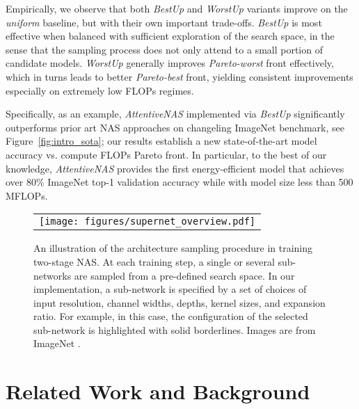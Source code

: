 \documentclass[final]{cvpr}
\theoremstyle{definition}
\begin{document}
Empirically, we observe that both \emph{BestUp} and \emph{WorstUp} variants improve on the \emph{uniform} baseline, but with their own important trade-offs. 
\emph{BestUp} is most effective when balanced with sufficient exploration of the search space, in the sense that the sampling process does not only attend to a small 
portion of candidate models. 
\emph{WorstUp} generally improves \emph{Pareto-worst} front effectively, 
which in turns leads to better \emph{Pareto-best} front, yielding 
consistent improvements especially on extremely low FLOPs regimes. 


Specifically, as an example, \emph{AttentiveNAS} implemented via \emph{BestUp} significantly outperforms prior art NAS approaches on changeling ImageNet benchmark, see Figure~\ref{fig:intro_sota};
our results establish a new state-of-the-art model accuracy vs.  compute FLOPs Pareto front.  In particular,  to the best of our knowledge, \emph{AttentiveNAS} 
provides the first energy-efficient model that achieves  over 80\% ImageNet top-1 validation accuracy while with model size less than 500 MFLOPs. 

\fi 
\begin{figure*}[ht]
\centering
\begin{tabular}{c}
\texttt{[image: figures/supernet\_overview.pdf]} 
\end{tabular}
\caption{
An illustration of the architecture sampling procedure in training two-stage NAS. 
At each training step, a single or several sub-networks are sampled from a pre-defined search space.
In our implementation, a sub-network is specified by a set of choices of input resolution, channel widths, depths, kernel sizes, and expansion ratio. 
For example, in this case, the configuration of the selected sub-network is highlighted with solid borderlines. 
Images are from ImageNet \cite{deng2009imagenet}.
}
\label{fig:superent_training}
\end{figure*}

\section{Related Work and Background}
\end{document}
